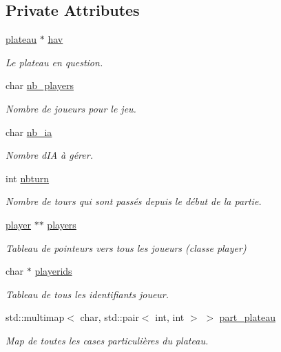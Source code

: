 \subsection*{Private Attributes}
\begin{DoxyCompactItemize}
\item 
\hyperlink{classplateau}{plateau} $\ast$ \hyperlink{classjeu_a7bd7f0a6992c018ddc2cdf2a0c6e1930}{hav}
\begin{DoxyCompactList}\small\item\em Le plateau en question. \end{DoxyCompactList}\item 
char \hyperlink{classjeu_af5d010efc2e6dec9ea8da739bd5f19b5}{nb\+\_\+players}
\begin{DoxyCompactList}\small\item\em Nombre de joueurs pour le jeu. \end{DoxyCompactList}\item 
char \hyperlink{classjeu_a725c0616180898259dd472d009e844fc}{nb\+\_\+ia}
\begin{DoxyCompactList}\small\item\em Nombre d\textquotesingle{}IA à gérer. \end{DoxyCompactList}\item 
int \hyperlink{classjeu_ae28d01ac3e91246e6269df4d62470913}{nbturn}
\begin{DoxyCompactList}\small\item\em Nombre de tours qui sont passés depuis le début de la partie. \end{DoxyCompactList}\item 
\hyperlink{classplayer}{player} $\ast$$\ast$ \hyperlink{classjeu_ae005d31d8935c2d9e7ddb53d25efcc31}{players}
\begin{DoxyCompactList}\small\item\em Tableau de pointeurs vers tous les joueurs (classe player) \end{DoxyCompactList}\item 
char $\ast$ \hyperlink{classjeu_ada4888da3a6c7036f47f47515f87a983}{playerids}
\begin{DoxyCompactList}\small\item\em Tableau de tous les identifiants joueur. \end{DoxyCompactList}\item 
std\+::multimap$<$ char, std\+::pair$<$ int, int $>$ $>$ \hyperlink{classjeu_abd8f4b8b02d750e302903f616e897ad0}{part\+\_\+plateau}
\begin{DoxyCompactList}\small\item\em Map de toutes les cases particulières du plateau. \end{DoxyCompactList}\end{DoxyCompactItemize}


